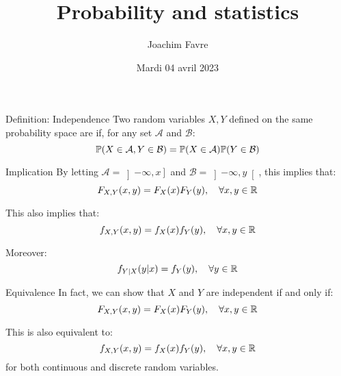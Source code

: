 \documentclass[a4paper]{article}
\title{Probability and statistics}
\author{Joachim Favre}
\date{Mardi 04 avril 2023}
\begin{document}
\maketitle


\begin{parag}{Definition: Independence}
    Two random variables $X, Y$ defined on the same probability space are  if, for any set $\mathcal{A}$ and $\mathcal{B}$: 
    \[\prob\left(X \in \mathcal{A}, Y \in \mathcal{B}\right) = \prob\left(X \in \mathcal{A}\right)\prob\left(Y \in \mathcal{B}\right)\]
    
    \begin{subparag}{Implication}
        By letting $\mathcal{A} = \left]-\infty, x\right] $ and $\mathcal{B} = \left]-\infty, y\right[ $, this implies that: 
        \[F_{X, Y}\left(x, y\right) = F_X\left(x\right) F_Y\left(y\right), \mathspace \forall x, y \in \mathbb{R}\]
        
        This also implies that: 
        \[f_{X, Y}\left(x, y\right) = f_X\left(x\right) f_Y\left(y\right), \mathspace \forall x, y \in \mathbb{R}\]
        
        Moreover:
        \[f_{Y|X}\left(y|x\right) = f_Y\left(y\right), \mathspace \forall y \in \mathbb{R}\]
    \end{subparag}

    \begin{subparag}{Equivalence}
        In fact, we can show that $X$ and $Y$ are independent if and only if: 
        \[F_{X, Y}\left(x, y\right) = F_X\left(x\right)F_Y\left(y\right), \mathspace \forall x, y \in \mathbb{R}\]

        This is also equivalent to:
        \[f_{X, Y}\left(x, y\right) = f_X\left(x\right)f_Y\left(y\right), \mathspace \forall x, y \in \mathbb{R}\]
        for both continuous and discrete random variables.
    \end{subparag}
\end{parag}
\end{document}
